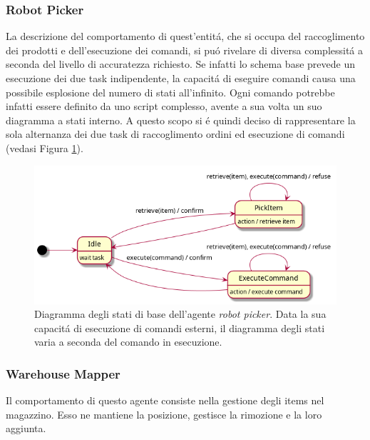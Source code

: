 \subsubsection{Robot Picker}
La descrizione del comportamento di quest'entit\'a, che si occupa del raccoglimento dei prodotti e dell'esecuzione dei comandi, si pu\'o rivelare di diversa complessit\'a a seconda del livello di accuratezza richiesto. Se infatti lo schema base prevede un esecuzione dei due task indipendente, la capacit\'a di eseguire comandi causa una possibile esplosione del numero di stati all'infinito. Ogni comando potrebbe infatti essere definito da uno script complesso, avente a sua volta un suo diagramma a stati interno. A questo scopo si \'e quindi deciso di rappresentare la sola alternanza dei due task di raccoglimento ordini ed esecuzione di comandi (vedasi Figura \ref{fig:rp-state-diagram}).
\begin{figure}[!ht]\centering
    \includegraphics[width=\textwidth]{section/design/figure/robot_picker/state_diagram.png}
    \caption{Diagramma degli stati di base dell'agente \textit{robot picker}. Data la sua capacit\'a di esecuzione di comandi esterni, il diagramma degli stati varia a seconda del comando in esecuzione.}
    \label{fig:rp-state-diagram}
\end{figure}

\subsubsection{Warehouse Mapper}
Il comportamento di questo agente consiste nella gestione degli items nel magazzino. Esso ne mantiene la posizione, gestisce la rimozione e la loro aggiunta.

